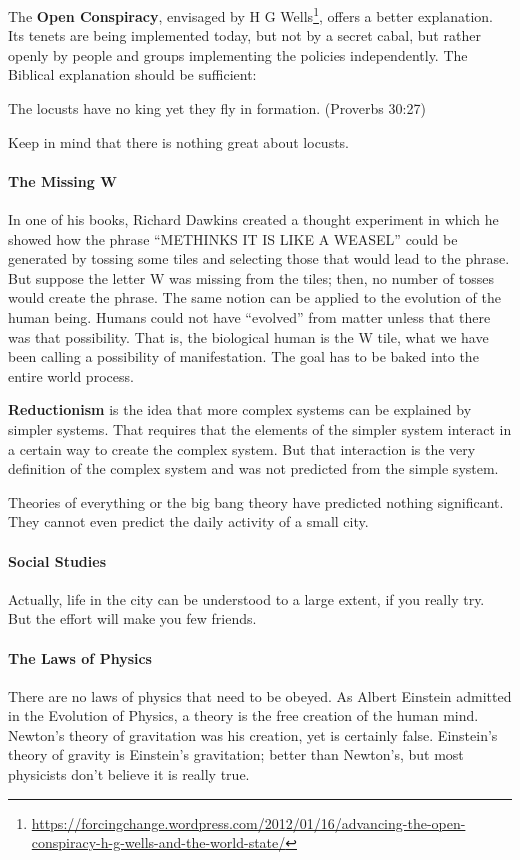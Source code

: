 The \textbf{Open Conspiracy}, envisaged by H G Wells\footnote{\url{https://forcingchange.wordpress.com/2012/01/16/advancing-the-open-conspiracy-h-g-wells-and-the-world-state/}}, offers a better explanation. Its tenets are being implemented
today, but not by a secret cabal, but rather openly by people and groups implementing the policies independently. The
Biblical explanation should be sufficient:

\begin{quotex}
The locusts have no king yet they fly in formation. (Proverbs 30:27) 

\end{quotex}
Keep in mind that there is nothing great about locusts.

\paragraph{The Missing W}
In one of his books, Richard Dawkins created a thought experiment in which he showed how the phrase “METHINKS IT IS LIKE
A WEASEL” could be generated by tossing some tiles and selecting those that would lead to the phrase. But suppose the
letter W was missing from the tiles; then, no number of tosses would create the phrase. The same notion can be applied
to the evolution of the human being. Humans could not have “evolved” from matter unless that there was that
possibility. That is, the biological human is the W tile, what we have been calling a possibility of manifestation. The
goal has to be baked into the entire world process.

\textbf{Reductionism} is the idea that more complex systems can be explained by simpler systems. That requires that the
elements of the simpler system interact in a certain way to create the complex system. But that interaction is the very
definition of the complex system and was not predicted from the simple system.

Theories of everything or the big bang theory have predicted nothing significant. They cannot even predict the daily
activity of a small city.

\paragraph{Social Studies}
Actually, life in the city can be understood to a large extent, if you really try. But the effort will make you few
friends.

\paragraph{The Laws of Physics}
There are no laws of physics that need to be obeyed. As Albert Einstein admitted in the Evolution of Physics, a theory
is the free creation of the human mind. Newton's theory of gravitation was his creation, yet is certainly
false. Einstein's theory of gravity is Einstein's gravitation; better than
Newton's, but most physicists don't believe it is really true.

